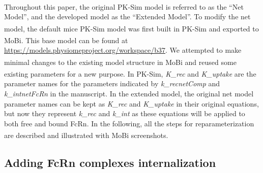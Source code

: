 \documentclass[fleqn,10pt]{physiome}
\begin{document}
Throughout this paper, the original PK-Sim\textsuperscript{\textregistered} model is referred to as the ``Net Model'', and the developed model as the ``Extended Model''. To modify the net model, the default mice PK-Sim\textsuperscript{\textregistered} model was first built 
 in PK-Sim\textsuperscript{\textregistered} and exported to MoBi\textsuperscript{\textregistered}. This base model can be found at \url{https://models.physiomeproject.org/workspace/b37}. We attempted to make minimal changes to the existing model structure in MoBi\textsuperscript{\textregistered} and reused some existing parameters for a new purpose. In PK-Sim\textsuperscript{\textregistered}, \textit{K\_rec} and \textit{K\_uptake} are the parameter names for the parameters indicated by \textit{k\_recnetComp} and \textit{k\_intnetFcRn} in the manuscript. In the extended model, the original net model parameter names can be kept as \textit{K\_rec} and \textit{K\_uptake} in their original equations, but now they represent \textit{k\_rec} and \textit{k\_int} as these equations will be applied to both free and bound FcRn. In the following, all the steps for reparameterization are described and illustrated with MoBi\textsuperscript{\textregistered} screenshots.


\subsection{Adding FcRn complexes internalization}\label{SS1}
\end{document}
